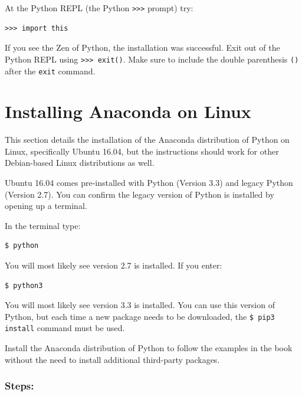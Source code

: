 \documentclass{book}
\begin{document}
At the Python REPL (the Python \lstinline!>>>! prompt) try:

\begin{lstlisting}
>>> import this
\end{lstlisting}

If you see the Zen of Python, the installation was successful. Exit out
of the Python REPL using \lstinline!>>> exit()!. Make sure to include
the double parenthesis \lstinline!()! after the \lstinline!exit!
command.
    




    
        \section{Installing Anaconda on
Linux}\label{installing-anaconda-on-linux}
    




    
        This section details the installation of the Anaconda distribution of
Python on Linux, specifically Ubuntu 16.04, but the instructions should
work for other Debian-based Linux distributions as well.

Ubuntu 16.04 comes pre-installed with Python (Version 3.3) and legacy
Python (Version 2.7). You can confirm the legacy version of Python is
installed by opening up a terminal.

In the terminal type:

\begin{lstlisting}
$ python
\end{lstlisting}

You will most likely see version 2.7 is installed. If you enter:

\begin{lstlisting}
$ python3
\end{lstlisting}

You will most likely see version 3.3 is installed. You can use this
version of Python, but each time a new package needs to be downloaded,
the \lstinline!$ pip3 install! command must be used.

Install the Anaconda distribution of Python to follow the examples in
the book without the need to install additional third-party packages.
    




    
        \subsubsection{Steps:}\label{steps}
\end{document}
